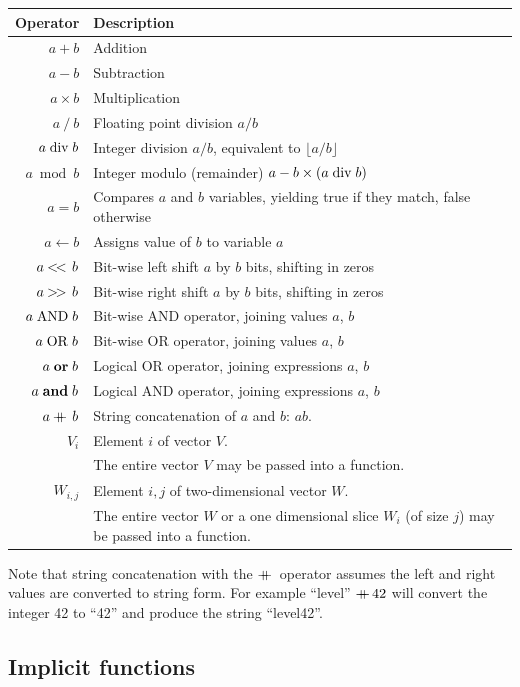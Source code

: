 \documentclass[a4paper]{article}
\begin{document}
\begin{tabular}{rl}
\hline
\textbf{Operator} & \textbf{Description}\\
\hline
$a + b$       & Addition \\
$a - b$       & Subtraction \\
$a \times b$  & Multiplication \\
$a\ /\ b$     & Floating point division $a/b$\\
$a \bdiv b$   & Integer division $a/b$, equivalent to $\lfloor{a/b}\rfloor$\\
$a \bmod b$   & Integer modulo (remainder) $a - b\times(a \bdiv b)$\\
$a = b$       & Compares $a$ and $b$ variables, yielding true if they match, false otherwise\\
$a \gets b$   & Assigns value of $b$ to variable $a$\\
$a \mathbin{<\mkern-3mu<\,} b$ & Bit-wise left shift $a$ by $b$ bits, shifting in zeros \\
$a \mathbin{>\mkern-3mu>\,} b$ & Bit-wise right shift $a$ by $b$ bits, shifting in zeros \\
$a \bitand b$ & Bit-wise AND operator, joining values $a$, $b$\\
$a \bitor b$  & Bit-wise OR operator, joining values $a$, $b$\\
$a \logor b$  & Logical OR operator, joining expressions $a$, $b$\\
$a \logand b$ & Logical AND operator, joining expressions $a$, $b$\\
$a \mathbin{+\mkern-10mu+\,} b$ & String concatenation of $a$ and $b$: $ab$.\\
$V_i$         & Element $i$ of vector $V$.\\
              & The entire vector $V$ may be passed into a function.\\
$W_{i,j}$      & Element $i,j$ of two-dimensional vector $W$.\\
              & The entire vector $W$ or a one dimensional slice $W_i$ (of size $j$) may be passed into a function.\\
\hline
\end{tabular}

Note that string concatenation with the $\mathbin{+\mkern-10mu+\,}$ operator
assumes the left and right values are converted to string form.  For
example ``level'' $\mathbin{+\mkern-10mu+\,} 42$ will convert the integer 42 to ``42''
and produce the string ``level42''.

\subsection{Implicit functions}
\end{document}
